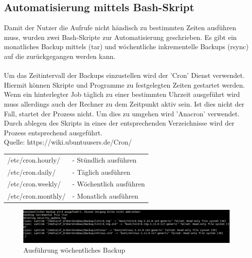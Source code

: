 \newpage %

\subsection{Automatisierung mittels Bash-Skript} %
Damit der Nutzer die Aufrufe nicht händisch zu bestimmten Zeiten ausführen muss, wurden zwei Bash-Skripte zur Automatisierung geschrieben. Es gibt ein monatliches Backup mittels (tar) und wöchentliche inkrementelle Backups (rsync) auf die zurückgegangen werden kann.\\
\\
Um das Zeitintervall der Backups einzustellen wird der 'Cron' Dienst verwendet.
Hiermit können Skripte und Programme zu festgelegten Zeiten gestartet werden.
Wenn ein hinterlegter Job täglich zu einer bestimmten Uhrzeit ausgeführt wird muss allerdings auch der Rechner zu dem Zeitpunkt aktiv sein. Ist dies nicht der Fall, startet der Prozess nicht. Um dies zu umgehen wird 'Anacron' verwendet.
Durch ablegen des Skripts in eines der entsprechenden Verzeichnisse wird der Prozess entsprechend ausgeführt.\\
Quelle: https://wiki.ubuntuusers.de/Cron/ \cite{cron} \\
\begin{tabular}{l l}
/etc/cron.hourly/	&- Stündlich ausführen\\
/etc/cron.daily/	&- Täglich ausführen\\
/etc/cron.weekly/	&- Wöchentlich ausführen\\
/etc/cron.monthly/	&- Monatlich ausführen\\
\end{tabular}
\begin{figure}[ht]
\includegraphics[width=\textwidth]{pictures/Bastian/Woechentliches_Backup}
\caption{Ausführung wöchentliches Backup}
\end{figure}
